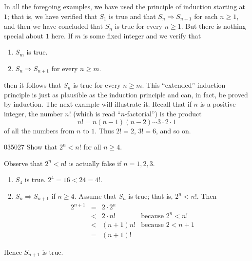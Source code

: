 In all the foregoing examples, we have used the principle of induction starting at $1$; that is, we have verified that $S_{1}$ is true and that $S_{n} \Rightarrow S_{n+1}$ for each $n \geq 1$, and then we have concluded that $S_{n}$ is true for every $n \geq 1$. But there is nothing special about $1$ here. If $m$ is some fixed integer and we verify that


\begin{enumerate}
\item $S_{m}$ is true.

\item $S_{n} \Rightarrow S_{n+1}$ for every $n \geq m$.

\end{enumerate}

\noindent then it follows that $S_{n}$ is true for every $n \geq m$.
 This ``extended'' induction principle is just as plausible as the 
induction principle and can, in fact, be proved by induction. The next 
example will illustrate it. Recall that if $n$ is a positive integer, the number $n!$ (which is read ``$n$-factorial'') is the product
\begin{equation*}
n! = n(n-1)(n-2)\cdots 3 \cdot 2 \cdot 1
\end{equation*}
of all the numbers from $n$ to $1$. Thus $2! = 2$, $3! = 6$, and so on.


\begin{example}{}{035027}
Show that $2^n < n!$ for all $n \geq 4$.


\begin{solution}
  Observe that $2^n < n!$ is actually false if $n = 1, 2, 3$.


\begin{enumerate}
\item $S_{4}$ is true. $2^4 = 16 < 24 = 4!$.

\item $S_{n} \Rightarrow S_{n+1}$ if $n \geq 4$. Assume that $S_{n}$ is true; that is, $2^n < n!$. Then
\begin{equation*}
\begin{array}{rcll}
2^{n+1} & = &2 \cdot 2^n &\\
 & < &2 \cdot n! & \mbox{because } 2^n < n! \\
 & < &(n+1)n! & \mbox{because } 2<n+1\\
&= &(n+1)! &
\end{array}
\end{equation*}
\end{enumerate}

Hence $S_{n+1}$ is true.
\end{solution}
\end{example}

